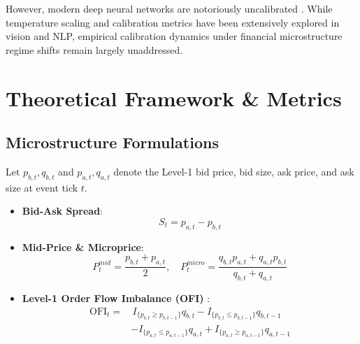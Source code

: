 \documentclass[10pt,twocolumn,letterpaper]{article}
\begin{document}
However, modern deep neural networks are notoriously uncalibrated \cite{guo2017calibration}. While temperature scaling and calibration metrics have been extensively explored in vision and NLP, empirical calibration dynamics under financial microstructure regime shifts remain largely unaddressed.

\section{Theoretical Framework \& Metrics}

\subsection{Microstructure Formulations}
Let $p_{b,t}, q_{b,t}$ and $p_{a,t}, q_{a,t}$ denote the Level-1 bid price, bid size, ask price, and ask size at event tick $t$.
\begin{itemize}
    \item \textbf{Bid-Ask Spread}:
    \begin{equation}
        S_t = p_{a,t} - p_{b,t}
    \end{equation}
    \item \textbf{Mid-Price \& Microprice}:
    \begin{equation}
        P_t^{mid} = \frac{p_{b,t} + p_{a,t}}{2}, \quad P_t^{micro} = \frac{q_{b,t} p_{a,t} + q_{a,t} p_{b,t}}{q_{b,t} + q_{a,t}}
    \end{equation}
    \item \textbf{Level-1 Order Flow Imbalance (OFI)} \cite{cont2014price}:
    \begin{align}
        \text{OFI}_t = &\, I_{\{p_{b,t} \ge p_{b,t-1}\}} q_{b,t} - I_{\{p_{b,t} \le p_{b,t-1}\}} q_{b,t-1} \nonumber \\
        & - I_{\{p_{a,t} \le p_{a,t-1}\}} q_{a,t} + I_{\{p_{a,t} \ge p_{a,t-1}\}} q_{a,t-1}
    \end{align}
\end{itemize}
\end{document}

